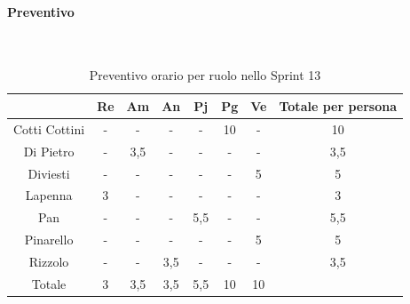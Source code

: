 \documentclass{article}
\begin{document}
                \paragraph{Preventivo}\mbox{}\\
                \begin{table}[H]
                    \centering
                    \begin{tabular}{|c|c|c|c|c|c|c|c|}
                    \hline
                                  & Re  & Am  & An  & Pj  & Pg  & Ve  & Totale per persona \\ \hline
                    Cotti Cottini & -   & -   & -   & -   & 10  & -   & 10                 \\ \hline
                    Di Pietro     & -   & 3,5 & -   & -   & -   & -   & 3,5                \\ \hline
                    Diviesti      & -   & -   & -   & -   & -   & 5   & 5                  \\ \hline
                    Lapenna       & 3   & -   & -   & -   & -   & -   & 3                  \\ \hline
                    Pan           & -   & -   & -   & 5,5 & -   & -   & 5,5                \\ \hline
                    Pinarello     & -   & -   & -   & -   & -   & 5   & 5                  \\ \hline
                    Rizzolo       & -   & -   & 3,5 & -   & -   & -   & 3,5                \\ \hline
                    Totale        & 3   & 3,5 & 3,5 & 5,5 & 10  & 10  &                    \\ \hline
                    \end{tabular}
                    \caption{Preventivo orario per ruolo nello Sprint 13}
                \end{table}

\end{document}
